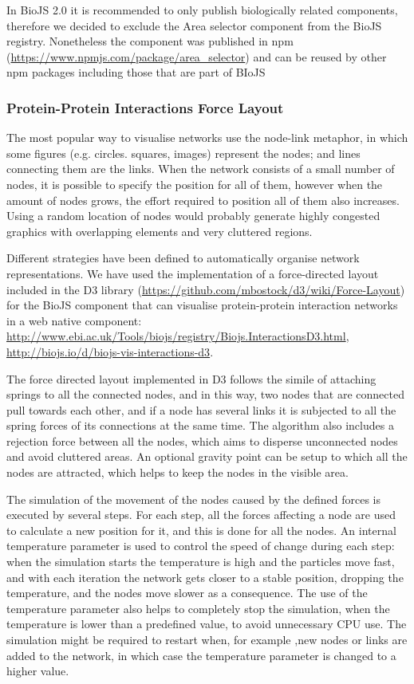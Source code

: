 In BioJS 2.0 it is recommended to only publish biologically related components, therefore we decided to exclude the Area selector component from the BioJS registry. Nonetheless the component was published in npm (\url{https://www.npmjs.com/package/area_selector}) and can be reused by other npm packages including those that are part of BIoJS
 
\subsubsection{Protein-Protein Interactions Force Layout} \label{subsubsec:ppi_biojs}
The most popular way to visualise networks use the node-link metaphor, in which some figures (e.g. circles. squares, images) represent the nodes; and lines connecting them are the links. When the network consists of a small number of nodes, it is possible to specify the position for all of them, however when the amount of nodes grows, the effort required to position all of them also increases. Using a random location of nodes would probably generate highly congested graphics with overlapping elements and very cluttered regions.

Different strategies have been defined to automatically organise network representations. We have used the implementation of a force-directed layout included in the D3 library (\url{https://github.com/mbostock/d3/wiki/Force-Layout}) \cite{BOS2011} for the BioJS component that can visualise protein-protein interaction networks in a web native component:  \url{http://www.ebi.ac.uk/Tools/biojs/registry/Biojs.InteractionsD3.html}, \url{http://biojs.io/d/biojs-vis-interactions-d3}.

The force directed layout implemented in D3 follows the simile of attaching springs to all the connected nodes, and in this way, two nodes that are connected pull towards each other, and if a node has several links it is subjected to all the spring forces of its connections at the same time. The algorithm also includes a rejection force between all the nodes, which aims to disperse unconnected nodes and avoid cluttered areas. An optional gravity point can be setup to which all the nodes are attracted, which helps to keep the nodes in the visible area. 

The simulation of the movement of the nodes caused by the defined forces is executed by several steps. For each step, all the forces affecting a node are used to calculate a new position for it, and this is done for all the nodes. An internal temperature parameter is used to control the speed of change during each step: when the simulation starts the temperature is high and the particles move fast, and with each iteration the network gets closer to a stable position, dropping the temperature, and the nodes move slower as a consequence. The use of the temperature parameter also helps to completely stop the simulation, when the temperature is lower than a predefined value, to avoid unnecessary CPU use. The simulation might be required to restart when, for example ,new nodes or links are added to the network, in which case the temperature parameter is changed to a higher value.

